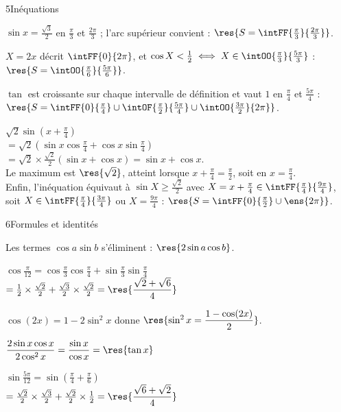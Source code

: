 \begin{deuxcolonnes}
\begin{corrige}{5}{Inéquations}
\begin{questions}
  \item $\sin x=\frac{\sqrt3}{2}$ en $\frac{\pi}{3}$ et $\frac{2\pi}{3}$ ; l'arc supérieur convient : $\res{S=\intFF{\frac{\pi}{3}}{\frac{2\pi}{3}}}$.
  \item $X=2x$ décrit $\intFF{0}{2\pi}$, et $\cos X<\frac12\iff X\in\intOO{\frac{\pi}{3}}{\frac{5\pi}{3}}$ :
    $\res{S=\intOO{\frac{\pi}{6}}{\frac{5\pi}{6}}}$.
  \item $\tan$ est croissante sur chaque intervalle de définition et vaut $1$ en $\frac{\pi}{4}$ et $\frac{5\pi}{4}$ :
    $\res{S=\intFF{0}{\frac{\pi}{4}}\cup\intOF{\frac{\pi}{2}}{\frac{5\pi}{4}}\cup\intOO{\frac{3\pi}{2}}{2\pi}}$.
  \item $\sqrt2\sin\left(x+\frac{\pi}{4}\right)$\\
    $=\sqrt2\left(\sin x\cos\frac{\pi}{4}+\cos x\sin\frac{\pi}{4}\right)$\\
    $=\sqrt2\times\frac{\sqrt2}{2}(\sin x+\cos x)=\sin x+\cos x$.\\
    Le maximum est $\res{\sqrt2}$, atteint lorsque $x+\frac{\pi}{4}=\frac{\pi}{2}$, soit en $x=\frac{\pi}{4}$.\\
    Enfin, l'inéquation équivaut à $\sin X\geq\frac{\sqrt2}{2}$ avec $X=x+\frac{\pi}{4}\in\intFF{\frac{\pi}{4}}{\frac{9\pi}{4}}$, soit
    $X\in\intFF{\frac{\pi}{4}}{\frac{3\pi}{4}}$ ou $X=\frac{9\pi}{4}$ : $\res{S=\intFF{0}{\frac{\pi}{2}}\cup\ens{2\pi}}$.
\end{questions}
\end{corrige}

\begin{corrige}{6}{Formules et identités}
\begin{questions}
  \item Les termes $\cos a\sin b$ s'éliminent : $\res{2\sin a\cos b}$.
  \item $\cos\frac{\pi}{12}=\cos\frac{\pi}{3}\cos\frac{\pi}{4}+\sin\frac{\pi}{3}\sin\frac{\pi}{4}$\\
    $=\frac12\times\frac{\sqrt2}{2}+\frac{\sqrt3}{2}\times\frac{\sqrt2}{2}=\res{\dfrac{\sqrt2+\sqrt6}{4}}$
  \item $\cos(2x)=1-2\sin^{2}x$ donne $\res{\sin^{2}x=\dfrac{1-\cos(2x)}{2}}$.
  \item $\dfrac{2\sin x\cos x}{2\cos^{2}x}=\dfrac{\sin x}{\cos x}=\res{\tan x}$
  \item $\sin\frac{5\pi}{12}=\sin\left(\frac{\pi}{4}+\frac{\pi}{6}\right)$\\
    $=\frac{\sqrt2}{2}\times\frac{\sqrt3}{2}+\frac{\sqrt2}{2}\times\frac12=\res{\dfrac{\sqrt6+\sqrt2}{4}}$
\end{questions}
\end{corrige}


\end{deuxcolonnes}
